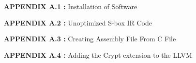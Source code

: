 \singlespacing


\begin{itemize}[leftmargin=3.3cm,itemsep=-0.4em,labelsep=1.5mm] %
\item [\textbf{APPENDIX A.1 :}]Installation of Software
\item [\textbf{APPENDIX A.2 :}]Unoptimized S-box IR Code
\item [\textbf{APPENDIX A.3 :}]Creating Assembly File From C File
\item [\textbf{APPENDIX A.4 :}]Adding the Crypt extension to the LLVM
\end{itemize}

\newpage